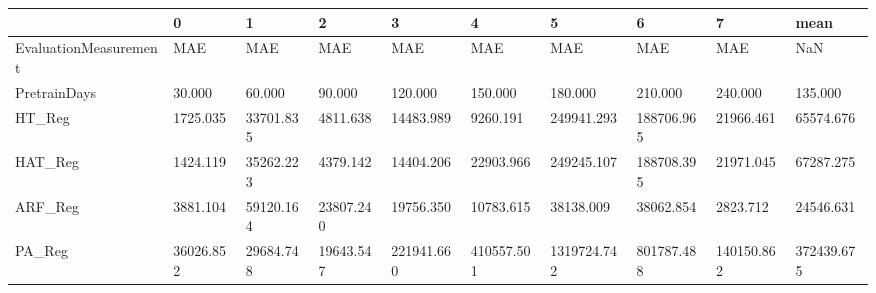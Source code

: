 \begin{tabular}{llllllllll}
\toprule
{} &         0 &         1 &         2 &          3 &          4 &           5 &          6 &          7 &       mean \\
\midrule
EvaluationMeasurement &       MAE &       MAE &       MAE &        MAE &        MAE &         MAE &        MAE &        MAE &        NaN \\
PretrainDays          &    30.000 &    60.000 &    90.000 &    120.000 &    150.000 &     180.000 &    210.000 &    240.000 &    135.000 \\
HT\_Reg                &  1725.035 & 33701.835 &  4811.638 &  14483.989 &   9260.191 &  249941.293 & 188706.965 &  21966.461 &  65574.676 \\
HAT\_Reg               &  1424.119 & 35262.223 &  4379.142 &  14404.206 &  22903.966 &  249245.107 & 188708.395 &  21971.045 &  67287.275 \\
ARF\_Reg               &  3881.104 & 59120.164 & 23807.240 &  19756.350 &  10783.615 &   38138.009 &  38062.854 &   2823.712 &  24546.631 \\
PA\_Reg                & 36026.852 & 29684.748 & 19643.547 & 221941.660 & 410557.501 & 1319724.742 & 801787.488 & 140150.862 & 372439.675 \\
\bottomrule
\end{tabular}
